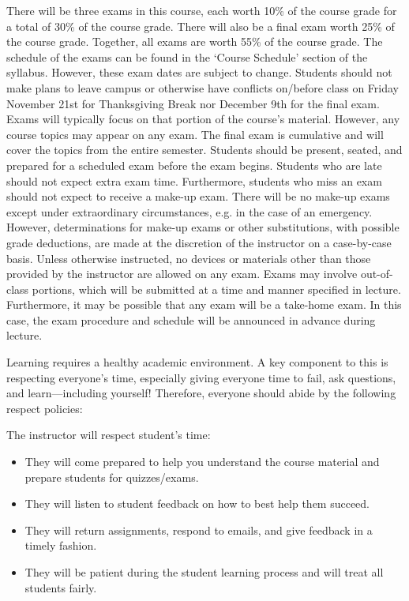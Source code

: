 \documentclass[11pt,letterpaper]{article}
\begin{document}

There will be three exams in this course, each worth 10\% of the course grade for a total of 30\% of the course grade. There will also be a final exam worth 25\% of the course grade. Together, all exams are worth 55\% of the course grade. The schedule of the exams can be found in the `Course Schedule' section of the syllabus. However, these exam dates are subject to change. Students should not make plans to leave campus or otherwise have conflicts on/before class on Friday November 21st for Thanksgiving Break nor December 9th for the final exam. Exams will typically focus on that portion of the course's material. However, any course topics may appear on any exam. The final exam is cumulative and will cover the topics from the entire semester. Students should be present, seated, and prepared for a scheduled exam before the exam begins. Students who are late should not expect extra exam time. Furthermore, students who miss an exam should not expect to receive a make-up exam. There will be no make-up exams except under extraordinary circumstances, e.g. in the case of an emergency. However, determinations for make-up exams or other substitutions, with possible grade deductions, are made at the discretion of the instructor on a case-by-case basis. Unless otherwise instructed, no devices or materials other than those provided by the instructor are allowed on any exam. Exams may involve out-of-class portions, which will be submitted at a time and manner specified in lecture. Furthermore, it may be possible that any exam will be a take-home exam. In this case, the exam procedure and schedule will be announced in advance during lecture. 
\sectionbreak




Learning requires a healthy academic environment. A key component to this is respecting everyone's time, especially giving everyone time to fail, ask questions, and learn---including yourself! Therefore, everyone should abide by the following respect policies: \pspace

The instructor will respect student's time:
	\begin{itemize}
	\item They will come prepared to help you understand the course material and prepare students for quizzes/exams. 
	\item They will listen to student feedback on how to best help them succeed. 
	\item They will return assignments, respond to emails, and give feedback in a timely fashion. 
	\item They will be patient during the student learning process and will treat all students fairly. 
	\end{itemize} \pspace
\end{document}
